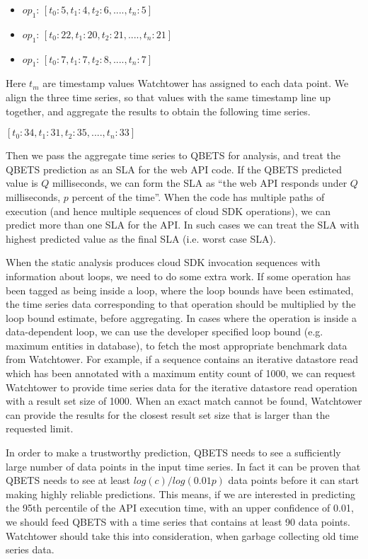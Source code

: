 \begin{itemize}
\item $op_{1}$: $[t_{0}: 5, t_{1}: 4, t_{2}: 6, ...., t_{n}: 5]$
\item $op_{1}$: $[t_{0}: 22, t_{1}: 20, t_{2}: 21, ...., t_{n}: 21]$
\item $op_{1}$: $[t_{0}: 7, t_{1}: 7, t_{2}: 8, ...., t_{n}: 7]$
\end{itemize}

Here $t_{m}$ are timestamp values Watchtower has assigned to each data point. We align the three
time series, so that values with the same timestamp line up together, and aggregate the results
to obtain the following time series.

$[t_{0}: 34, t_{1}: 31, t_{2}: 35, ...., t_{n}: 33]$

Then we pass the aggregate time series to QBETS for analysis, and
treat the QBETS prediction as an SLA for the web API code.
If the QBETS predicted value is $Q$ milliseconds, we can form the SLA as ``the web API responds 
under $Q$ milliseconds, $p$ percent of the time''. When the code has multiple paths of execution (and
hence multiple sequences of cloud SDK operations), we can predict more than one SLA for the API. In
such cases we can treat the SLA with highest predicted value as the final SLA (i.e. worst case SLA).

When the static analysis produces cloud SDK invocation sequences with information about loops, we 
need to do some extra work. If some operation has been tagged as being inside a loop, where the loop
bounds have been estimated, the time series data corresponding to that operation should be multiplied 
by the loop bound estimate, before aggregating. In cases where the operation is inside a data-dependent
loop, we can use the developer specified loop bound (e.g. maximum entities
in database), to fetch the most appropriate benchmark data from Watchtower.
For example, if a sequence contains an iterative datastore read which has been annotated with a maximum
entity count of 1000, we can request Watchtower to provide time series data for the iterative datastore
read operation with a result set size of 1000. When an exact match cannot be found, Watchtower can
provide the results for the closest result set size that is larger than the requested limit.

In order to make a trustworthy prediction, QBETS needs to see a sufficiently large number of data points
in the input time series. In fact it can be proven that QBETS needs to see at least $log(c)/log(0.01p)$ data points
before it can start making highly reliable predictions. This means, if we are interested in predicting the 95th percentile
of the API execution time, with an upper confidence of 0.01, we should feed QBETS with a time series that
contains at least 90 data points. Watchtower should take this into consideration, when garbage collecting old
time series data. %

